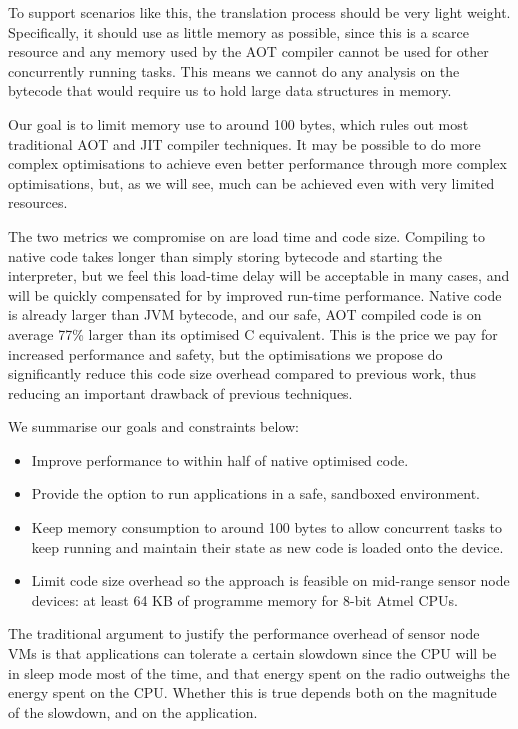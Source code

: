 To support scenarios like this, the translation process should be very light weight. Specifically, it should use as little memory as possible, since this is a scarce resource and any memory used by the AOT compiler cannot be used for other concurrently running tasks. This means we cannot do any analysis on the bytecode that would require us to hold large data structures in memory.

Our goal is to limit memory use to around 100 bytes, which rules out most traditional AOT and JIT compiler techniques. It may be possible to do more complex optimisations to achieve even better performance through more complex optimisations, but, as we will see, much can be achieved even with very limited resources.

The two metrics we compromise on are load time and code size. Compiling to native code takes longer than simply storing bytecode and starting the interpreter, but we feel this load-time delay will be acceptable in many cases, and will be quickly compensated for by improved run-time performance. Native code is already larger than JVM bytecode, and our safe, AOT compiled code is on average 77\% larger than its optimised C equivalent. This is the price we pay for increased performance and safety, but the optimisations we propose do significantly reduce this code size overhead compared to previous work, thus reducing an important drawback of previous techniques.

We summarise our goals and constraints below:
\begin{itemize}
  \item Improve performance to within half of native optimised code.
  \item Provide the option to run applications in a safe, sandboxed environment.
  \item Keep memory consumption to around 100 bytes to allow concurrent tasks to keep running and maintain their state as new code is loaded onto the device.
  \item Limit code size overhead so the approach is feasible on mid-range sensor node devices: at least 64 KB of programme memory for 8-bit Atmel CPUs.
\end{itemize}

The traditional argument to justify the performance overhead of sensor node VMs is that applications can tolerate a certain slowdown since the CPU will be in sleep mode most of the time, and that energy spent on the radio outweighs the energy spent on the CPU. Whether this is true depends both on the magnitude of the slowdown, and on the application.

